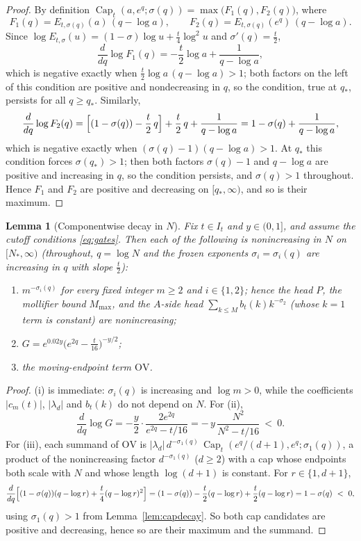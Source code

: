 \documentclass[11pt]{article}
\newtheorem{lemma}[theorem]{Lemma}
\theoremstyle{definition}
\newcommand{\CapT}{\operatorname{Cap}}
\begin{document}
\begin{proof}
By definition
$\CapT_t(a,e^q;\sigma(q))=\max\bigl(F_1(q),F_2(q)\bigr)$, where
\[
F_1(q)=E_{t,\sigma(q)}(a)\,(q-\log a),
\qquad
F_2(q)=E_{t,\sigma(q)}(e^q)\,(q-\log a).
\]
Since $\log E_{t,\sigma}(u)=(1-\sigma)\log u+\frac t4\log^2u$ and
$\sigma'(q)=\frac t2$,
\[
\frac{d}{dq}\log F_1(q)
=-\frac t2\log a+\frac1{q-\log a},
\]
which is negative exactly when
$\frac t2\log a\,(q-\log a)>1$; both factors on the left of this
condition are positive and nondecreasing in $q$, so the condition,
true at $q_*$, persists for all $q\ge q_*$. Similarly,
\[
\frac{d}{dq}\log F_2(q)
=\Bigl[(1-\sigma(q))-\frac t2\,q\Bigr]+\frac t2\,q
+\frac1{q-\log a}
=1-\sigma(q)+\frac1{q-\log a},
\]
which is negative exactly when $(\sigma(q)-1)(q-\log a)>1$. At
$q_*$ this condition forces $\sigma(q_*)>1$; then both factors
$\sigma(q)-1$ and $q-\log a$ are positive and increasing in $q$,
so the condition persists, and $\sigma(q)>1$ throughout. Hence
$F_1$ and $F_2$ are positive and decreasing on $[q_*,\infty)$, and
so is their maximum.
\end{proof}

\begin{lemma}[Componentwise decay in $N$]\label{lem:compdecay}
Fix $t\in I_t$ and $y\in(0,1]$, and assume the cutoff conditions
\eqref{eq:gates}. Then each of the following is nonincreasing in
$N$ on $[N_*,\infty)$ (throughout, $q=\log N$ and the frozen
exponents $\sigma_i=\sigma_i(q)$ are increasing in $q$ with slope
$\frac t2$):
\begin{enumerate}
\item[\textup{(i)}] $m^{-\sigma_i(q)}$ for every fixed integer
$m\ge2$ and $i\in\{1,2\}$; hence the head $P$, the mollifier
bound $M_{\max}$, and the $A$-side head
$\sum_{k\le M}b_t(k)k^{-\sigma_2}$ (whose $k=1$ term is constant)
are nonincreasing;
\item[\textup{(ii)}] $G=e^{0.02y}\bigl(e^{2q}-\frac t{16}\bigr)^{-y/2}$;
\item[\textup{(iii)}] the moving-endpoint term $\mathrm{OV}$.
\end{enumerate}
\end{lemma}

\begin{proof}
(i) is immediate: $\sigma_i(q)$ is increasing and $\log m>0$,
while the coefficients $|c_m(t)|$, $|\lambda_d|$ and $b_t(k)$ do
not depend on $N$. For (ii),
\[
\frac{d}{dq}\log G
=-\frac y2\cdot\frac{2e^{2q}}{e^{2q}-t/16}
=-\,y\,\frac{N^2}{N^2-t/16}\ <\ 0 .
\]
For (iii), each summand of $\mathrm{OV}$ is
$|\lambda_d|\,d^{-\sigma_1(q)}\,
\CapT_t(e^q/(d+1),e^q;\sigma_1(q))$, a product of the
nonincreasing factor $d^{-\sigma_1(q)}$ ($d\ge2$) with a cap whose
endpoints both scale with $N$ and whose length $\log(d+1)$ is
constant. For $r\in\{1,d+1\}$,
\[
\frac{d}{dq}\Bigl[(1-\sigma(q))(q-\log r)
+\frac t4(q-\log r)^2\Bigr]
=(1-\sigma(q))-\frac t2(q-\log r)+\frac t2(q-\log r)
=1-\sigma(q)\ <\ 0,
\]
using $\sigma_1(q)>1$ from Lemma~\ref{lem:capdecay}. So both cap
candidates are positive and decreasing, hence so are their maximum
and the summand.
\end{proof}
\end{document}

